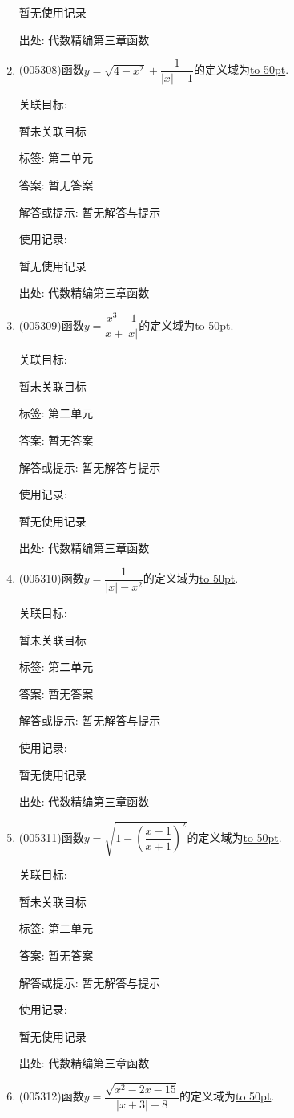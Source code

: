 \documentclass[10pt,a4paper]{article}
\newcommand{\blank}[1]{\underline{\hbox to #1pt{}}}
\begin{document}
\begin{enumerate}[1.]
暂无使用记录


出处: 代数精编第三章函数
\item { (005308)}函数$y=\sqrt {4-x^2}+\dfrac 1{|x|-1}$的定义域为\blank{50}.


关联目标:

暂未关联目标



标签: 第二单元

答案: 暂无答案

解答或提示: 暂无解答与提示

使用记录:

暂无使用记录


出处: 代数精编第三章函数
\item { (005309)}函数$y=\dfrac{x^3-1}{x+|x|}$的定义域为\blank{50}.


关联目标:

暂未关联目标



标签: 第二单元

答案: 暂无答案

解答或提示: 暂无解答与提示

使用记录:

暂无使用记录


出处: 代数精编第三章函数
\item { (005310)}函数$y=\dfrac 1{|x|-x^2}$的定义域为\blank{50}.


关联目标:

暂未关联目标



标签: 第二单元

答案: 暂无答案

解答或提示: 暂无解答与提示

使用记录:

暂无使用记录


出处: 代数精编第三章函数
\item { (005311)}函数$y=\sqrt {1-(\dfrac{x-1}{x+1})^2}$的定义域为\blank{50}.


关联目标:

暂未关联目标



标签: 第二单元

答案: 暂无答案

解答或提示: 暂无解答与提示

使用记录:

暂无使用记录


出处: 代数精编第三章函数
\item { (005312)}函数$y=\dfrac{\sqrt {x^2-2x-15}}{|x+3|-8}$的定义域为\blank{50}.



\end{enumerate}
\end{document}
